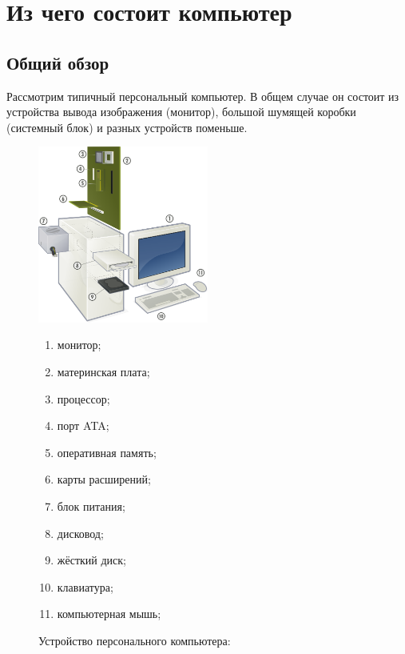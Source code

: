 \section{Из чего состоит компьютер}\label{base:introduction:components}
\subsection{Общий обзор}\label{base:introduction:components:review}
Рассмотрим типичный персональный компьютер. В общем случае он состоит из устройства вывода изображения (монитор), большой шумящей коробки (системный блок) и разных устройств поменьше.
\begin{figure}[h!]
 \centering
 \includegraphics[width=0.5\textwidth]{base/Introduction/Computer.png}
 \label{Base:introduction:components:review:computerpic}
 \caption{Устройство персонального компьютера:}
 \footnotesize
 \begin{enumerate}
  \item монитор;
  \item материнская плата;
  \item процессор;
  \item порт ATA;
  \item оперативная память;
  \item карты расширений;
  \item блок питания;
  \item дисковод;
  \item жёсткий диск;
  \item клавиатура;
  \item компьютерная мышь;
 \end{enumerate}
\end{figure}

